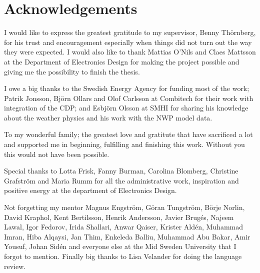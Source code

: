 
\chapter{Acknowledgements}

I would like to express the greatest gratitude to my supervisor, Benny Thörnberg, for his trust and encouragement especially when things did not turn out the way they were expected.
I would also like to thank Mattias O'Nils and Claes Mattsson at the Department of Electronics Design for making the project possible and giving me the possibility to finish the thesis. 

I owe a big thanks to the Swedish Energy Agency for funding most of the work; Patrik Jonsson, Björn Ollars and Olof Carlsson at Combitech for their work with integration of the CDP; and Esbjörn Olsson at SMHI for sharing his knowledge about the weather physics and his work with the NWP model data.

To my wonderful family; the greatest love and gratitute that have sacrificed a lot and supported me in beginning, fulfilling and finishing this work. Without you this would not have been possible.

Special thanks to Lotta Frisk, Fanny Burman, Carolina Blomberg, Christine Grafström and Maria Rumm for all the administrative work, inspiration and positive energy at the department of Electronics Design.

Not forgetting my mentor Magnus Engström, Göran Tungström, Börje Norlin, David Kraphol, Kent Bertilsson, Henrik Andersson, Javier Brugés, Najeem Lawal, Igor Fedorov, Irida Shallari, Anwar Qaiser, Krister Aldén, Muhammad Imran, Hiba Alqaysi, Jan Thim, Enkeleda Balliu, Muhammad Abu Bakar, Amir Yousuf, Johan Sidén and everyone else at the Mid Sweden University that I forgot to mention. Finally big thanks to Lisa Velander for doing the language review.